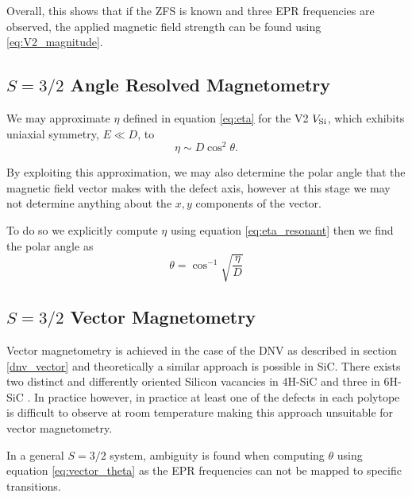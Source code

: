 Overall, this shows that if the ZFS is known and three EPR frequencies are observed, the applied magnetic field strength can be found using \eqref{eq:V2_magnitude}.




\subsection{$S=3/2$ Angle Resolved Magnetometry}
We may approximate $\eta$ defined in equation \eqref{eq:eta} for the V2 $V_{\ce{Si}}$, which exhibits uniaxial symmetry, $E\ll D$, to 
\begin{equation}
    \eta \sim D \cos^2 \theta. 
    \label{eq:}
\end{equation}

By exploiting this approximation, we may also determine the polar angle that the magnetic field vector makes with the defect axis, however at this stage we may not determine anything about the $x,y$ components of the vector. 

To do so we explicitly compute $\eta$ using equation \eqref{eq:eta_resonant} then we find the polar angle as 
\begin{equation}
    \theta = \cos^{-1}\sqrt{\frac{\eta}{D}}
    \label{eq:vector_theta}
\end{equation}


\subsection{$S = 3/2$ Vector Magnetometry}
Vector magnetometry is achieved in the case of the DNV as described in section \ref{dnv_vector}  and theoretically a similar approach is possible in SiC. There exists two distinct and differently oriented Silicon vacancies in 4H-SiC and three in 6H-SiC \cite{Janzn2009}. In practice however, in practice at least one of the defects in each polytope is difficult to observe at room temperature making this approach unsuitable for vector magnetometry. 

In a general $S = 3/2$ system, ambiguity is found when computing $\theta$ using equation \eqref{eq:vector_theta} as the EPR frequencies can not be mapped to specific transitions. 

